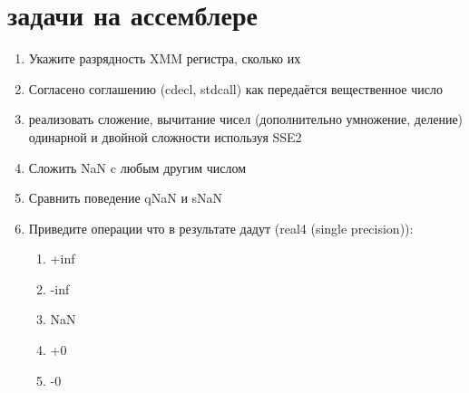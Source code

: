 \documentclass[a4paper,10pt]{article}
\begin{document}
\section*{задачи на ассемблере}
\begin{enumerate}
    \item Укажите разрядность XMM регистра, сколько их
    \item Согласено соглашению (cdecl, stdcall) как передаётся вещественное число
    \item реализовать сложение, вычитание чисел (дополнительно умножение, деление) одинарной и двойной сложности используя SSE2
    \item Сложить NaN c любым другим числом
    \item Сравнить поведение qNaN и sNaN
    \item Приведите операции что в результате дадут (real4 (single precision)):
    \begin{enumerate}
        \item +inf
        \item -inf
        \item NaN
        \item +0
        \item -0
    \end{enumerate}
\end{enumerate}
\end{document}
